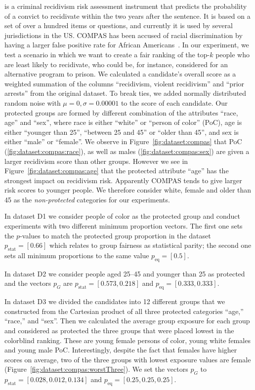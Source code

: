  is a criminal recidivism risk assessment instrument that predicts the probability of a convict to recidivate within the two years after the sentence. It is based on a set of over a hundred items or questions, and currently it is used by several jurisdictions in the US.
%
COMPAS has been accused of racial discrimination by having a larger false positive rate for African Americans~\cite{angwin_2016_machine}.
%
In our experiment, we test a scenario in which we want to create a fair ranking of the top-$k$ people who are least likely to recidivate, who could be, for instance, considered for an alternative program to prison.
%
We calculated a candidate's overall score as a weighted summation of the columns ``recidivism, violent recidivism'' and ``prior arrests'' from the original dataset.
%
To break ties, we added normally distributed random noise with $\mu=0, \sigma=0.00001$ to the score of each candidate.
%
Our protected groups are formed by different combination of the attributes ``race, age'' and ``sex'', where race is either ``white'' or ``person of color'' (PoC), age is either ``younger than 25'', ``between 25 and 45'' or ``older than 45'', and sex is either ``male'' or ``female''.
%
We observe in Figure~\ref{fig:dataset:compas} that PoC (\ref{fig:dataset:compas:race}), as well as males (\ref{fig:dataset:compas:sex}) are given a larger recidivism score than other groups.
%
However we see in Figure~\ref{fig:dataset:compas:age} that the protected attribute ``age'' has the strongest impact on recidivism risk.
%
Apparently COMPAS tends to give larger risk scores to younger people.
%
We therefore consider white, female and older than 45 as the \emph{non-protected} categories for our experiments.


In dataset D1 we consider people of color as the protected group and conduct experiments with two different minimum proportion vectors.
%
The first one sets the $p$-values to match the protected group proportion in the dataset $p_{\text{stat}}=[0.66]$ which relates to group fairness as statistical parity; the second one sets all minimum proportions to the same value $p_{\text{eq}}=[0.5]$.


In dataset D2 we consider people aged 25--45 and younger than 25 as protected and the vectors $p_G$ are $p_{\text{stat}}=[0.573,0.218]$ and $p_{\text{eq}}=[0.333, 0.333]$.


In dataset D3 we divided the candidates into 12 different groups that we constructed from the Cartesian product of all three protected categories ``age,'' ``race,'' and ``sex''.
%
Then we calculated the average group exposure for each group and considered as protected the three groups that were placed lowest in the colorblind ranking.
%
These are young female persons of color, young white females and young male PoC.
%
Interestingly, despite the fact that females have higher scores on average, two of the three groups with lowest exposure values are female (Figure~\ref{fig:dataset:compas:worstThree}).
%
We set the vectors $p_G$ to $p_{\text{stat}}=[0.028,0.012,0.134]$ and $p_{\text{eq}}=[0.25,0.25,0.25]$.


